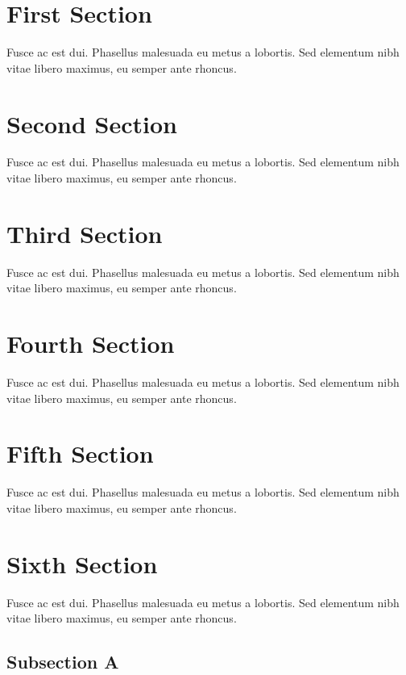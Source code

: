 \par\section{First Section}
\par\noindent Fusce ac est dui. Phasellus malesuada eu metus a lobortis. Sed elementum nibh vitae libero maximus, eu semper ante rhoncus.
\par\section{Second Section}
\par\noindent Fusce ac est dui. Phasellus malesuada eu metus a lobortis. Sed elementum nibh vitae libero maximus, eu semper ante rhoncus. 
\par\section{Third Section}\label{subsec:ch4.sec1.subsec2}
\par\noindent Fusce ac est dui. Phasellus malesuada eu metus a lobortis. Sed elementum nibh vitae libero maximus, eu semper ante rhoncus. 
\par\section{Fourth Section}
\par\noindent Fusce ac est dui. Phasellus malesuada eu metus a lobortis. Sed elementum nibh vitae libero maximus, eu semper ante rhoncus.
\par\section{Fifth Section}\label{subsec:ch4.sec1.subsec5}
\par\noindent Fusce ac est dui. Phasellus malesuada eu metus a lobortis. Sed elementum nibh vitae libero maximus, eu semper ante rhoncus. 
\par\section{Sixth Section}
\par\noindent Fusce ac est dui. Phasellus malesuada eu metus a lobortis. Sed elementum nibh vitae libero maximus, eu semper ante rhoncus. 
\par\subsection{Subsection A}
